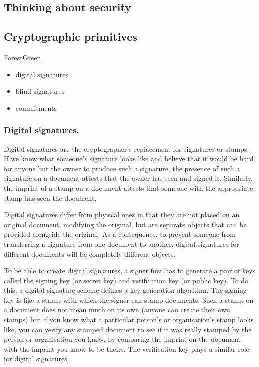 \documentclass{llncs}
\newenvironment{structure}{
  \begin{color}{ForestGreen}
}{
  \end{color}
}
\begin{document}
\subsection{Thinking about security}

\subsection{Cryptographic primitives}

\begin{structure}
\begin{itemize}
\item digital signatures
\item blind signatures
\item commitments
\end{itemize}
\end{structure}

\subsubsection{Digital signatures.}


Digital signatures are the cryptographer's replacement for signatures or stamps.
If we know what someone's signature looks like and believe that it would be hard
for anyone but the owner to produce such a signature, the presence of such a
signature on a document attests that the owner has seen and signed it.
Similarly, the imprint of a stamp on a document attests that someone with the
appropriate stamp has seen the document.

Digital signatures differ from phyiscal ones in that they are not placed on an
original document, modifying the original, but are separate objects that can be
provided alongside the original. As a consequence, to prevent someone from
transferring a signature from one document to another, digital signatures for
different documents will be completely different objects.

To be able to create digital signatures, a signer first has to generate a pair
of keys called the signing key (or secret key) and verification key (or public
key). To do this, a digital signature scheme defines a key generation algorithm.
The signing key is like a stamp with which the signer can stamp documents. Such
a stamp on a document does not mean much on its own (anyone can create their own
stamps) but if you know what a particular person's or organisation's stamp looks
like, you can verify any stamped document to see if it was really stamped by the
person or organisation you know, by comparing the imprint on the document with
the imprint you know to be theirs. The verification key plays a similar role for
digital signatures.
\end{document}
